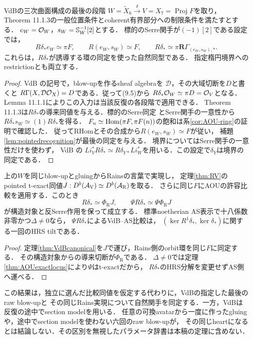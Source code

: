 \begin{theorem}[VdBの最後の比較関手は反標準導来切断である]\label{thm:VdBcanonical}
VdBの三次曲面構成の最後の段階
$W=\widetilde X_6\xrightarrow{\delta}V=X_7=\operatorname{Proj}F$を取り，
Theorem 11.1.3の一般位置条件とcoherent有界部分への制限条件を満たすとする．
$e_W=\mathcal O_W$，$s_W=\mathbb S_W^{-1}[2]$とする．
標的のSerre関手が$(-1)[2]$である設定では，
\[
 R\delta_*e_W\simeq\pi F,\qquad
 R(e_W,s_W)\simeq F,\qquad
 \boxed{R\delta_*\simeq\pi\mathbf R\Gamma_{(e_W,s_W),*}}.
\]
これらは，$R\delta_*$が誘導する環の同定を使った自然同型である．
指定楕円境界へのrestrictionとも両立する．
\end{theorem}
\begin{proof}
VdB \cite[(9.5), Proposition 9.2.3(1)]{VdB}の記号で，blow-upを作るsheaf algebraを
$\mathcal D$，その大域切断を$D$と書くと
$R\Gamma(X,\mathcal D\mathcal O_X)=D$である．従って(9.5)から
$R\delta_*\mathcal O_W\simeq\pi D=\mathcal O_V$となる．
Lemma 11.1.1によりこの入力は当該反復の各段階で適用できる．
Theorem 11.1.3は$R\delta_*$の導来同値を与える．標的のSerre同定
\cite[Lemma 9.2]{AOU}とSerre関手の一意性から
$R\delta_*s_W\simeq(1)R\delta_*$を得る．
$F_n\simeq\operatorname{Hom}(\pi F,\pi F(n))$の飽和は系\ref{cor:AOU-ring}の証明で確認した．
従ってRHomとその合成から$R(e_W,s_W)\simeq F$が従い，
補題\ref{lem:pointedrecognition}が最後の同定を与える．
境界についてはSerre関手の一意性だけを使わず，
VdB \cite[Proposition 9.1.8, (9.11)]{VdB}の
$Li_V^*R\delta_*\simeq R\delta_{Y*}Li_W^*$を用いる．この設定で$\delta_Y$は境界の同定である．
\end{proof}

\begin{corollary}[同じ表示での四者の接続]\label{cor:fourfunctors}
上の$W$を同じblow-upとgluingからRainsの言葉で実現し，
定理\ref{thm:RV}のpointed t-exact同値$J:D^b(\mathcal A_{\mathrm V})\simeq D^b(\mathcal A_{\mathrm R})$を取る．
さらに同じ$F$にAOUの許容比較を適用する．このとき
\[
 R\delta_*\simeq\Phi_{\mathrm R}J,\qquad
 \Psi R\delta_*\simeq\Psi\Phi_{\mathrm R}J
\]
が構造対象と反Serre作用を保って成立する．
標準noetherian AS表示で十八係数非零かつ$\Delta\ne0$なら，
$\Psi R\delta_*$によるVdB--AS比較は，
$(\ker R^1\delta_*,\ker\delta_*)$に関する一回のHRS tiltである．
\end{corollary}
\begin{proof}
定理\ref{thm:VdBcanonical}を$J$で運び，Rains側のorbit環を同じ$F$に同定する．
その構造対象からの導来切断が$\Phi_{\mathrm R}$である．
$\Delta\ne0$では定理\ref{thm:AOUexactlocus}により$\Psi$はt-exactだから，
$R\delta_*$のHRS分解を変更せずAS側へ運べる．
\end{proof}
\begin{remark}[同じデータの意味と残る範囲]
この結果は，独立に選んだ比較同値を仮定する代わりに，VdBの指定した最後のraw blow-upと
その同じRains実現について自然関手を同定する．一方，VdBは反復の途中でsection modelを用いる．
任意の可換avatarから一度に作ったgluingや，途中でsection modelを使わない六回のraw blow-upが，
その同じheartになるとは結論しない．その区別を無視したパラメータ辞書は本稿の定理に含めない．
\end{remark}

